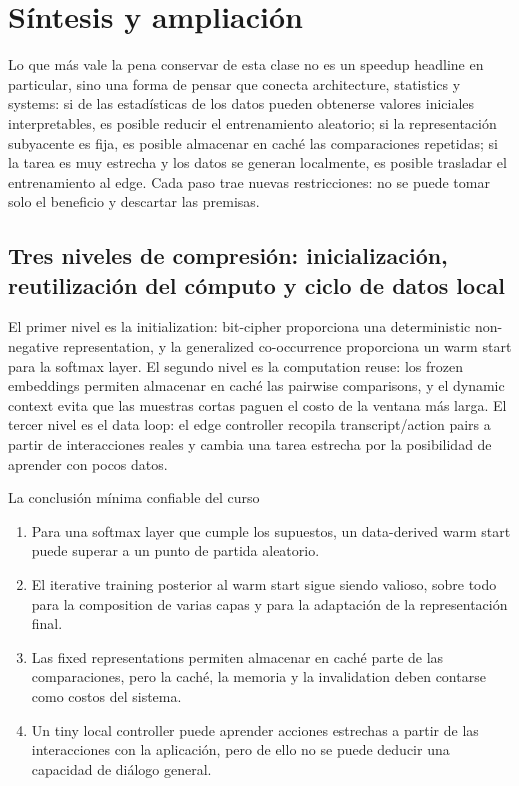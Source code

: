 \documentclass[a4paper]{article}
\begin{document}
\section{Síntesis y ampliación}

Lo que más vale la pena conservar de esta clase no es un speedup headline en particular, sino una forma de pensar que conecta architecture, statistics y systems: si de las estadísticas de los datos pueden obtenerse valores iniciales interpretables, es posible reducir el entrenamiento aleatorio; si la representación subyacente es fija, es posible almacenar en caché las comparaciones repetidas; si la tarea es muy estrecha y los datos se generan localmente, es posible trasladar el entrenamiento al edge. Cada paso trae nuevas restricciones: no se puede tomar solo el beneficio y descartar las premisas.

\subsection{Tres niveles de compresión: inicialización, reutilización del cómputo y ciclo de datos local}

El primer nivel es la initialization: bit-cipher proporciona una deterministic non-negative representation, y la generalized co-occurrence proporciona un warm start para la softmax layer. El segundo nivel es la computation reuse: los frozen embeddings permiten almacenar en caché las pairwise comparisons, y el dynamic context evita que las muestras cortas paguen el costo de la ventana más larga. El tercer nivel es el data loop: el edge controller recopila transcript/action pairs a partir de interacciones reales y cambia una tarea estrecha por la posibilidad de aprender con pocos datos.

\begin{importantbox}{La conclusión mínima confiable del curso}
\begin{enumerate}
  \item Para una softmax layer que cumple los supuestos, un data-derived warm start puede superar a un punto de partida aleatorio.
  \item El iterative training posterior al warm start sigue siendo valioso, sobre todo para la composition de varias capas y para la adaptación de la representación final.
  \item Las fixed representations permiten almacenar en caché parte de las comparaciones, pero la caché, la memoria y la invalidation deben contarse como costos del sistema.
  \item Un tiny local controller puede aprender acciones estrechas a partir de las interacciones con la aplicación, pero de ello no se puede deducir una capacidad de diálogo general.
\end{enumerate}
\end{importantbox}
\end{document}
